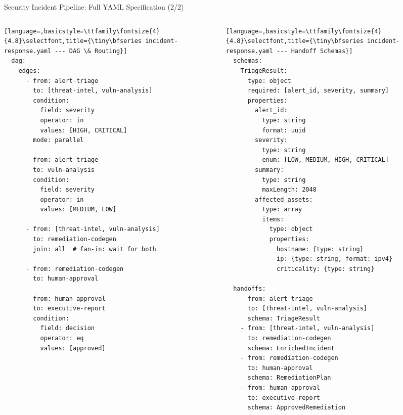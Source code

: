 \begin{frame}[fragile]{\fontsize{11}{13}\selectfont Security Incident Pipeline: Full YAML Specification (2/2)}
  \vspace{-0.2cm}
  \begin{columns}[T]
    \begin{column}{0.50\textwidth}
      \begin{lstlisting}[language=,basicstyle=\ttfamily\fontsize{4}{4.8}\selectfont,title={\tiny\bfseries incident-response.yaml --- DAG \& Routing}]
  dag:
    edges:
      - from: alert-triage
        to: [threat-intel, vuln-analysis]
        condition:
          field: severity
          operator: in
          values: [HIGH, CRITICAL]
        mode: parallel

      - from: alert-triage
        to: vuln-analysis
        condition:
          field: severity
          operator: in
          values: [MEDIUM, LOW]

      - from: [threat-intel, vuln-analysis]
        to: remediation-codegen
        join: all  # fan-in: wait for both

      - from: remediation-codegen
        to: human-approval

      - from: human-approval
        to: executive-report
        condition:
          field: decision
          operator: eq
          values: [approved]
      \end{lstlisting}
    \end{column}
    \begin{column}{0.50\textwidth}
      \begin{lstlisting}[language=,basicstyle=\ttfamily\fontsize{4}{4.8}\selectfont,title={\tiny\bfseries incident-response.yaml --- Handoff Schemas}]
  schemas:
    TriageResult:
      type: object
      required: [alert_id, severity, summary]
      properties:
        alert_id:
          type: string
          format: uuid
        severity:
          type: string
          enum: [LOW, MEDIUM, HIGH, CRITICAL]
        summary:
          type: string
          maxLength: 2048
        affected_assets:
          type: array
          items:
            type: object
            properties:
              hostname: {type: string}
              ip: {type: string, format: ipv4}
              criticality: {type: string}

  handoffs:
    - from: alert-triage
      to: [threat-intel, vuln-analysis]
      schema: TriageResult
    - from: [threat-intel, vuln-analysis]
      to: remediation-codegen
      schema: EnrichedIncident
    - from: remediation-codegen
      to: human-approval
      schema: RemediationPlan
    - from: human-approval
      to: executive-report
      schema: ApprovedRemediation
      \end{lstlisting}
    \end{column}
  \end{columns}
\end{frame}
